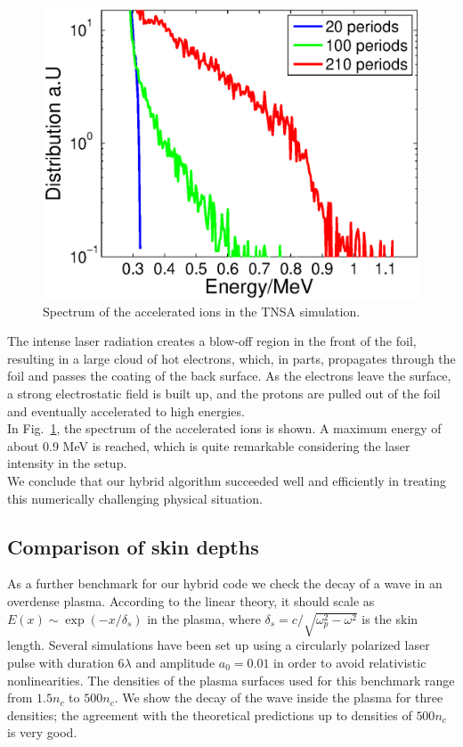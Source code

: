 \documentclass[conference]{IEEEtran}
\renewcommand{\~}{\widetilde }
\begin{document}
\begin{figure}[H]
	\begin{center}
		\includegraphics[width=0.7\columnwidth]{spec.eps}
		\caption{Spectrum of the accelerated ions in the TNSA simulation.}
		\label{spec}
	\end{center}
\end{figure}
The intense laser radiation creates a blow-off region in the front of the foil, resulting in a large cloud of hot electrons, which, in parts, propagates through the foil and passes the coating of the back surface. As the electrons leave the surface, a strong electrostatic field is built up, and the protons are pulled out of the foil and eventually accelerated to high energies. \\
In Fig.~\ref{spec}, the spectrum of the accelerated ions is shown. A maximum energy of about 0.9 MeV is reached, which is quite remarkable considering the laser intensity in the setup. \\
We conclude that our hybrid algorithm succeeded well and efficiently in treating this numerically challenging physical situation. 

\subsection{Comparison of skin depths}
As a further benchmark for our hybrid code we check the decay of a wave in an overdense plasma. According to the linear
theory, it should scale as $E(x) \sim \exp(-x/\delta_s)$ in the plasma, where $\delta_s = c/\sqrt{\omega_p^2 - \omega^2}$ is the skin length.
Several simulations have been set up using a circularly polarized laser pulse with duration $6 \lambda$ and amplitude $a_0 = 0.01$ in order 
to avoid relativistic nonlinearities. The densities of the plasma surfaces used for this benchmark range from $1.5 n_c$ to $500 n_c$.
We show the decay of the wave inside the plasma for three densities; the agreement with the theoretical predictions up to densities of $500 n_c$ is very good. \newline
\end{document}
